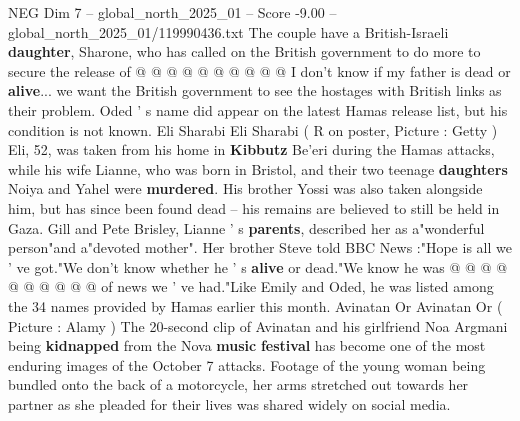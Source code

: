 \begin{textsample}{NEG Dim 7 – global\_north\_2025\_01 – Score -9.00 – global\_north\_2025\_01/119990436.txt}
The couple have a British-Israeli \textbf{daughter}, Sharone, who has called on the British government to do more to secure the release of @ @ @ @ @ @ @ @ @ @ I don't know if my father is dead or \textbf{alive}... we want the British government to see the hostages with British links as their problem.
Oded ' s name did appear on the latest Hamas release list, but his condition is not known.
Eli Sharabi Eli Sharabi ( R on poster, Picture : Getty ) Eli, 52, was taken from his home in \textbf{Kibbutz} Be'eri during the Hamas attacks, while his wife Lianne, who was born in Bristol, and their two teenage \textbf{daughters} Noiya and Yahel were \textbf{murdered}.
His brother Yossi was also taken alongside him, but has since been found dead -- his remains are believed to still be held in Gaza.
Gill and Pete Brisley, Lianne ' s \textbf{parents}, described her as a"wonderful person"and a"devoted mother".
Her brother Steve told BBC News :"Hope is all we ' ve got."We don't know whether he ' s \textbf{alive} or dead."We know he was @ @ @ @ @ @ @ @ @ @ of news we ' ve had."Like Emily and Oded, he was listed among the 34 names provided by Hamas earlier this month.
Avinatan Or Avinatan Or ( Picture : Alamy ) The 20-second clip of Avinatan and his girlfriend Noa Argmani being \textbf{kidnapped} from the Nova \textbf{music} \textbf{festival} has become one of the most enduring images of the October 7 attacks.
Footage of the young woman being bundled onto the back of a motorcycle, her arms stretched out towards her partner as she pleaded for their lives was shared widely on social media.

\end{textsample}
